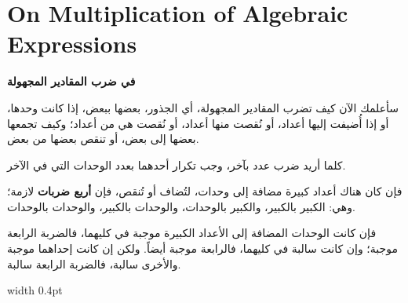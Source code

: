 \documentclass[11pt,a4paper]{book}
\begin{document}
\newpage

\chapter{On Multiplication of Algebraic Expressions}
\label{ch:multiplication}

\noindent\begin{minipage}[t]{0.48\textwidth}
\raggedleft

\begin{Arabic}
\textbf{في ضرب المقادير المجهولة}

سأعلمك الآن كيف تضرب المقادير المجهولة، أي الجذور، بعضها ببعض، إذا كانت وحدها، أو إذا أُضيفت إليها أعداد، أو نُقصت منها أعداد، أو نُقصت هي من أعداد؛ وكيف تجمعها بعضها إلى بعض، أو تنقص بعضها من بعض.

كلما أريد ضرب عدد بآخر، وجب تكرار أحدهما بعدد الوحدات التي في الآخر.

فإن كان هناك أعداد كبيرة مضافة إلى وحدات، لتُضاف أو تُنقص، فإن \textbf{أربع ضربات} لازمة؛ وهي: الكبير بالكبير، والكبير بالوحدات، والوحدات بالكبير، والوحدات بالوحدات.

فإن كانت الوحدات المضافة إلى الأعداد الكبيرة موجبة في كليهما، فالضربة الرابعة موجبة؛ وإن كانت سالبة في كليهما، فالرابعة موجبة أيضاً. ولكن إن كانت إحداهما موجبة والأخرى سالبة، فالضربة الرابعة سالبة.
\end{Arabic}

\end{minipage}%
\hfill\vrule width 0.4pt\hfill
\end{document}
